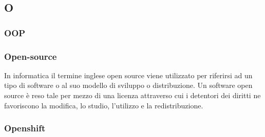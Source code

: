 \subsection*{\textbf{\hfill \Huge{O} \hfill}} 
\subsubsection*{OOP}

\subsubsection*{Open-source}
In informatica il termine inglese open source viene utilizzato per riferirsi ad un tipo di software o al suo modello di sviluppo o distribuzione. Un software open source è reso tale per mezzo di una licenza attraverso cui i detentori dei diritti ne favoriscono la modifica, lo studio, l'utilizzo e la redistribuzione.
\subsubsection*{Openshift}

